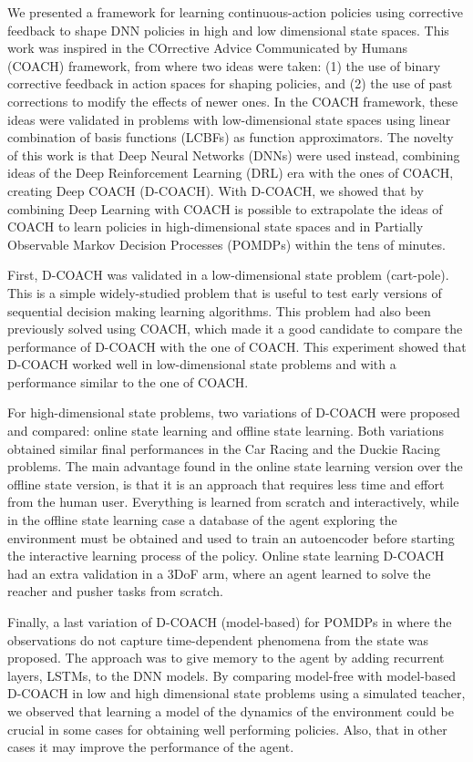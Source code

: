 \begin{conclusion}
We presented a framework for learning continuous-action policies using corrective feedback to shape DNN policies in high and low dimensional state spaces. This work was inspired in the COrrective Advice Communicated by Humans (COACH) framework, from where two ideas were taken: (1) the use of binary corrective feedback in action spaces for shaping policies, and (2) the use of past corrections to modify the effects of newer ones. In the COACH framework, these ideas were validated in problems with low-dimensional state spaces using linear combination of basis functions (LCBFs) as function approximators. The novelty of this work is that Deep Neural Networks (DNNs) were used instead, combining ideas of the Deep Reinforcement Learning (DRL) era with the ones of COACH, creating Deep COACH (D-COACH). With D-COACH, we showed that by combining Deep Learning with COACH is possible to extrapolate the ideas of COACH to learn policies in high-dimensional state spaces and in Partially Observable Markov Decision Processes (POMDPs) within the tens of minutes. 

First, D-COACH was validated in a low-dimensional state problem (cart-pole). This is a simple widely-studied problem that is useful to test early versions of sequential decision making learning algorithms. This problem had also been previously solved using COACH, which made it a good candidate to compare the performance of D-COACH with the one of COACH. This experiment showed that D-COACH worked well in low-dimensional state problems and with a performance similar to the one of COACH. 

For high-dimensional state problems, two variations of D-COACH were proposed and compared: online state learning and offline state learning. Both variations obtained similar final performances in the Car Racing and the Duckie Racing problems. The main advantage found in the online state learning version over the offline state version, is that it is an approach that requires less time and effort from the human user. Everything is learned from scratch and interactively, while in the offline state learning case a database of the agent exploring the environment must be obtained and used to train an autoencoder before starting the interactive learning process of the policy. Online state learning D-COACH had an extra validation in a 3DoF arm, where an agent learned to solve the reacher and pusher tasks from scratch.

Finally, a last variation of D-COACH (model-based) for POMDPs in where the observations do not capture time-dependent phenomena from the state was proposed. The approach was to give memory to the agent by adding recurrent layers, LSTMs, to the DNN models. By comparing model-free with model-based D-COACH in low and high dimensional state problems using a simulated teacher, we observed that learning a model of the dynamics of the environment could be crucial in some cases for obtaining well performing policies. Also, that in other cases it may improve the performance of the agent. 




\end{conclusion}
